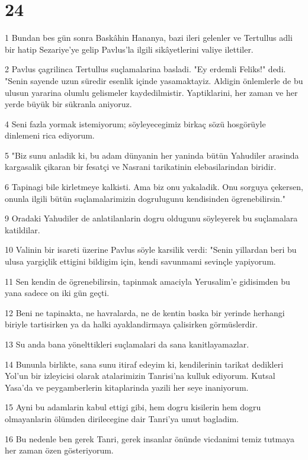 \chapter{24}

\par 1 Bundan bes gün sonra Baskâhin Hananya, bazi ileri gelenler ve Tertullus adli bir hatip Sezariye'ye gelip Pavlus'la ilgili sikâyetlerini valiye ilettiler.
\par 2 Pavlus çagrilinca Tertullus suçlamalarina basladi. "Ey erdemli Feliks!" dedi. "Senin sayende uzun süredir esenlik içinde yasamaktayiz. Aldigin önlemlerle de bu ulusun yararina olumlu gelismeler kaydedilmistir. Yaptiklarini, her zaman ve her yerde büyük bir sükranla aniyoruz.
\par 4 Seni fazla yormak istemiyorum; söyleyecegimiz birkaç sözü hosgörüyle dinlemeni rica ediyorum.
\par 5 "Biz sunu anladik ki, bu adam dünyanin her yaninda bütün Yahudiler arasinda kargasalik çikaran bir fesatçi ve Nasrani tarikatinin elebasilarindan biridir.
\par 6 Tapinagi bile kirletmeye kalkisti. Ama biz onu yakaladik. Onu sorguya çekersen, onunla ilgili bütün suçlamalarimizin dogrulugunu kendisinden ögrenebilirsin."
\par 9 Oradaki Yahudiler de anlatilanlarin dogru oldugunu söyleyerek bu suçlamalara katildilar.
\par 10 Valinin bir isareti üzerine Pavlus söyle karsilik verdi: "Senin yillardan beri bu ulusa yargiçlik ettigini bildigim için, kendi savunmami sevinçle yapiyorum.
\par 11 Sen kendin de ögrenebilirsin, tapinmak amaciyla Yerusalim'e gidisimden bu yana sadece on iki gün geçti.
\par 12 Beni ne tapinakta, ne havralarda, ne de kentin baska bir yerinde herhangi biriyle tartisirken ya da halki ayaklandirmaya çalisirken görmüslerdir.
\par 13 Su anda bana yönelttikleri suçlamalari da sana kanitlayamazlar.
\par 14 Bununla birlikte, sana sunu itiraf edeyim ki, kendilerinin tarikat dedikleri Yol'un bir izleyicisi olarak atalarimizin Tanrisi'na kulluk ediyorum. Kutsal Yasa'da ve peygamberlerin kitaplarinda yazili her seye inaniyorum.
\par 15 Ayni bu adamlarin kabul ettigi gibi, hem dogru kisilerin hem dogru olmayanlarin ölümden dirilecegine dair Tanri'ya umut bagladim.
\par 16 Bu nedenle ben gerek Tanri, gerek insanlar önünde vicdanimi temiz tutmaya her zaman özen gösteriyorum.

